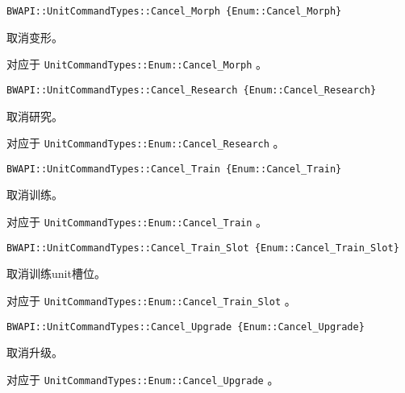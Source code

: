 \begin{tcolorbox}[colback=white, colframe=black!60!white, title=Cancel\_Morph\{\}, arc=0mm]
\begin{verbatim}
BWAPI::UnitCommandTypes::Cancel_Morph {Enum::Cancel_Morph}
\end{verbatim}
取消变形。\par 对应于   \verb|UnitCommandTypes::Enum::Cancel_Morph|  。
\end{tcolorbox}


\begin{tcolorbox}[colback=white, colframe=black!60!white, title=Cancel\_Research\{\}, arc=0mm]
\begin{verbatim}
BWAPI::UnitCommandTypes::Cancel_Research {Enum::Cancel_Research}
\end{verbatim}
取消研究。\par 对应于   \verb|UnitCommandTypes::Enum::Cancel_Research|  。
\end{tcolorbox}


\begin{tcolorbox}[colback=white, colframe=black!60!white, title=Cancel\_Train\{\}, arc=0mm]
\begin{verbatim}
BWAPI::UnitCommandTypes::Cancel_Train {Enum::Cancel_Train}
\end{verbatim}
取消训练。\par 对应于   \verb|UnitCommandTypes::Enum::Cancel_Train|  。
\end{tcolorbox}


\begin{tcolorbox}[colback=white, colframe=black!60!white, title=Cancel\_Train\_Slot\{\}, arc=0mm]
\begin{verbatim}
BWAPI::UnitCommandTypes::Cancel_Train_Slot {Enum::Cancel_Train_Slot}
\end{verbatim}
取消训练unit槽位。\par 对应于   \verb|UnitCommandTypes::Enum::Cancel_Train_Slot|  。
\end{tcolorbox}


\begin{tcolorbox}[colback=white, colframe=black!60!white, title=Cancel\_Upgrade\{\}, arc=0mm]
\begin{verbatim}
BWAPI::UnitCommandTypes::Cancel_Upgrade {Enum::Cancel_Upgrade}
\end{verbatim}
取消升级。\par 对应于   \verb|UnitCommandTypes::Enum::Cancel_Upgrade|  。
\end{tcolorbox}



